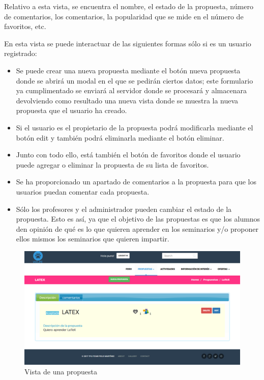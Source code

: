 Relativo a esta vista, se encuentra el nombre, el estado de la propuesta, número de comentarios, los comentarios, la popularidad que se mide en el número de favoritos, etc.


En esta vista se puede interactuar de las siguientes formas sólo si es un usuario registrado:


\begin{itemize}
\item Se puede crear una nueva propuesta mediante el botón nueva propuesta donde se abrirá un modal en el que se pedirán ciertos datos; este formulario ya cumplimentado se enviará al servidor donde se procesará y almacenara devolviendo como resultado una nueva vista donde se muestra la nueva propuesta que el usuario ha creado.
\item Si el usuario es el propietario de la propuesta podrá modificarla mediante el botón edit y también podrá eliminarla mediante el botón eliminar.
\item Junto con todo ello, está también el botón de favoritos donde el usuario puede agregar o eliminar la propuesta de su lista de favoritos.  
\item Se ha proporcionado un apartado de comentarios a la propuesta para que los usuarios puedan comentar cada propuesta.
\item Sólo los profesores y el administrador pueden cambiar el estado de la propuesta. Esto es así, ya que el objetivo de las propuestas es que los alumnos den opinión de qué es lo que quieren aprender en los seminarios y/o proponer ellos mismos los seminarios que quieren impartir.
\end{itemize}

\begin{figure}[H]
   \centering
   \includegraphics[width=12cm]{img/propuesta}
   \caption{Vista de una propuesta}
   \label{figura:propuesta}
\end{figure}

